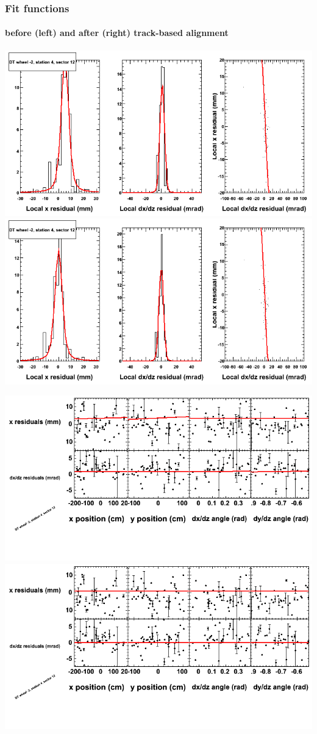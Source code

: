\documentclass[compress]{beamer}
\begin{document}
\begin{frame}
\frametitle{Fit functions}
\framesubtitle{before (left) and after (right) track-based alignment}
\includegraphics[width=0.5\linewidth]{fitfunctions_re01/MBwhAst4sec12_bellcurves.png} \includegraphics[width=0.5\linewidth]{fitfunctions_re05/MBwhAst4sec12_bellcurves.png}

\includegraphics[width=0.5\linewidth]{fitfunctions_re01/MBwhAst4sec12_polynomials.png} \includegraphics[width=0.5\linewidth]{fitfunctions_re05/MBwhAst4sec12_polynomials.png}
\end{frame}
\end{document}
